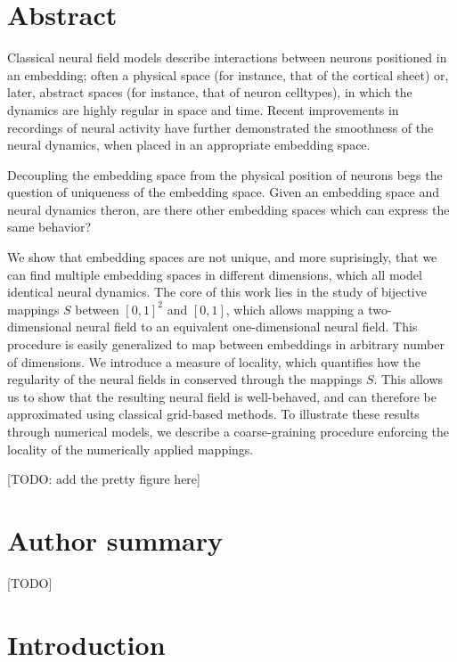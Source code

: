 \documentclass[10pt,letterpaper]{article}
\begin{document}
\section*{Abstract}
Classical neural field models describe interactions between neurons positioned in an embedding; often a physical space (for instance, that of the cortical sheet) or, later, abstract spaces (for instance, that of neuron celltypes), in which the dynamics are highly regular in space and time. Recent improvements in recordings of neural activity have further demonstrated the smoothness of the neural dynamics, when placed in an appropriate embedding space.

Decoupling the embedding space from the physical position of neurons begs the question of uniqueness of the embedding space. Given an embedding space and neural dynamics theron, are there other embedding spaces which can express the same behavior?

We show that embedding spaces are not unique, and more suprisingly, that we can find multiple embedding spaces in different dimensions, which all model identical neural dynamics.
The core of this work lies in the study of bijective mappings $S$ between $[0,1]^2$ and $[0,1]$, which allows mapping a two-dimensional neural field to an equivalent one-dimensional neural field.
This procedure is easily generalized to map between embeddings in arbitrary number of dimensions.
We introduce a measure of locality, which quantifies how the regularity of the neural fields in conserved through the mappings $S$. This allows us to show that the resulting neural field is well-behaved, and can therefore be approximated using classical grid-based methods.
To illustrate these results through numerical models, we describe a coarse-graining procedure enforcing the locality of the numerically applied mappings.

[TODO: add the pretty figure here]

\section*{Author summary}
[TODO]
\linenumbers


\section{Introduction}
\end{document}
